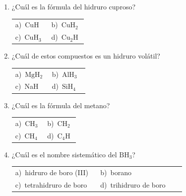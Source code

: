 \documentclass[11pt,a4paper]{article}
\begin{document}
\begin{enumerate}[label=\textbf{\arabic*.},leftmargin=*,itemsep=11pt,topsep=0pt]
\item \begin{minipage}[t]{\linewidth}
¿Cuál es la fórmula del hidruro cuproso?

\vspace{5pt}
\begin{tabular}{@{}p{0.47\linewidth}p{0.47\linewidth}@{}}
a)~CuH & b)~$\mathrm{CuH_{2}}$ \\
c)~$\mathrm{CuH_{3}}$ & d)~$\mathrm{Cu_{2}H}$ \\
\end{tabular}
\end{minipage}

\item \begin{minipage}[t]{\linewidth}
¿Cuál de estos compuestos es un hidruro volátil?

\vspace{5pt}
\begin{tabular}{@{}p{0.47\linewidth}p{0.47\linewidth}@{}}
a)~$\mathrm{MgH_{2}}$ & b)~$\mathrm{AlH_{3}}$ \\
c)~NaH & d)~$\mathrm{SiH_{4}}$ \\
\end{tabular}
\end{minipage}

\item \begin{minipage}[t]{\linewidth}
¿Cuál es la fórmula del metano?

\vspace{5pt}
\begin{tabular}{@{}p{0.47\linewidth}p{0.47\linewidth}@{}}
a)~$\mathrm{CH_{3}}$ & b)~$\mathrm{CH_{2}}$ \\
c)~$\mathrm{CH_{4}}$ & d)~$\mathrm{C_{4}H}$ \\
\end{tabular}
\end{minipage}

\item \begin{minipage}[t]{\linewidth}
¿Cuál es el nombre sistemático del $\mathrm{BH_{3}}$?

\vspace{5pt}
\begin{tabular}{@{}p{0.47\linewidth}p{0.47\linewidth}@{}}
a)~hidruro de boro (III) & b)~borano \\
c)~tetrahidruro de boro & d)~trihidruro de boro \\
\end{tabular}
\end{minipage}


\end{enumerate}
\end{document}
